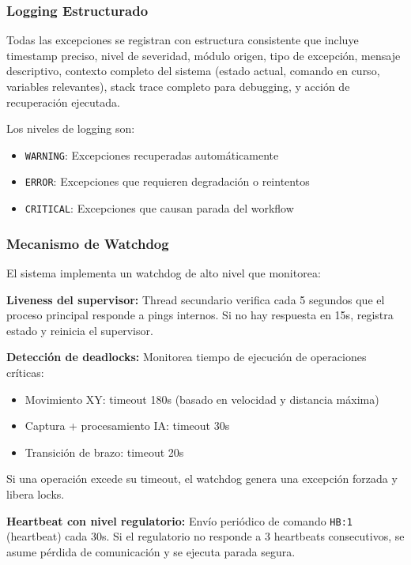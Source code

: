 \subsubsection{Logging Estructurado}

Todas las excepciones se registran con estructura consistente que incluye timestamp preciso, nivel de severidad, módulo origen, tipo de excepción, mensaje descriptivo, contexto completo del sistema (estado actual, comando en curso, variables relevantes), stack trace completo para debugging, y acción de recuperación ejecutada.

Los niveles de logging son:
\begin{itemize}
    \item \texttt{WARNING}: Excepciones recuperadas automáticamente
    \item \texttt{ERROR}: Excepciones que requieren degradación o reintentos
    \item \texttt{CRITICAL}: Excepciones que causan parada del workflow
\end{itemize}

\subsubsection{Mecanismo de Watchdog}

El sistema implementa un watchdog de alto nivel que monitorea:

\textbf{Liveness del supervisor:} Thread secundario verifica cada 5 segundos que el proceso principal responde a pings internos. Si no hay respuesta en 15s, registra estado y reinicia el supervisor.

\textbf{Detección de deadlocks:} Monitorea tiempo de ejecución de operaciones críticas:
\begin{itemize}
    \item Movimiento XY: timeout 180s (basado en velocidad y distancia máxima)
    \item Captura + procesamiento IA: timeout 30s
    \item Transición de brazo: timeout 20s
\end{itemize}

Si una operación excede su timeout, el watchdog genera una excepción forzada y libera locks.

\textbf{Heartbeat con nivel regulatorio:} Envío periódico de comando \texttt{HB:1} (heartbeat) cada 30s. Si el regulatorio no responde a 3 heartbeats consecutivos, se asume pérdida de comunicación y se ejecuta parada segura.

